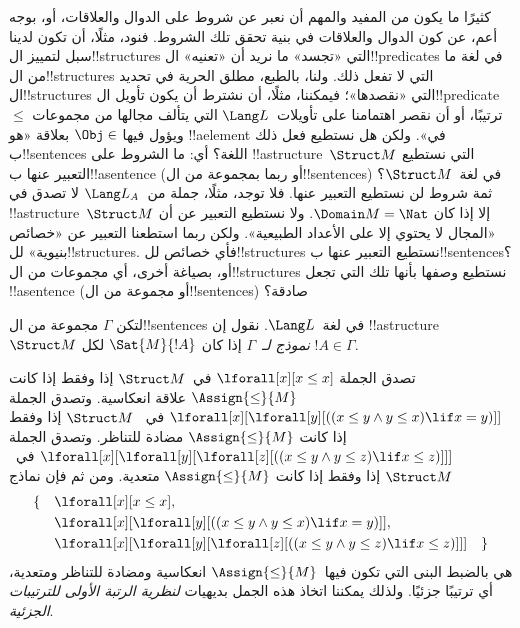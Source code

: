 \documentclass[../../../include/open-logic-section]{subfiles}
\begin{document}


\begin{explain}
كثيرًا ما يكون من المفيد والمهم أن نعبر عن شروط على الدوال والعلاقات،
أو، بوجه أعم، عن كون الدوال والعلاقات في بنية تحقق تلك الشروط. فنود،
مثلًا، أن تكون لدينا سبل لتمييز ال!!{structure}s التي «تجسد» ما نريد
أن «تعنيه» ال!!{predicate}s في لغة ما من ال!!{structure}s التي لا
تفعل ذلك. ولنا، بالطبع، مطلق الحرية في تحديد ال!!{structure}s التي
«نقصدها»؛ فيمكننا، مثلًا، أن نشترط أن يكون تأويل
ال!!{predicate}~$\le$ ترتيبًا، أو أن نقصر اهتمامنا على تأويلات~$\Lang
L$ التي يتألف مجالها من مجموعات ويؤول فيها $\Obj \in$ بعلاقة «هو
!!a{element} في». ولكن هل نستطيع فعل ذلك ب!!{sentence}s اللغة؟ أي:
ما الشروط على !!a{structure}~$\Struct M$ التي نستطيع التعبير عنها
ب!!a{sentence} (أو ربما بمجموعة من ال!!{sentence}s) في لغة~$\Struct
M$؟ ثمة شروط لن نستطيع التعبير عنها. فلا توجد، مثلًا، جملة من~$\Lang
L_A$ لا تصدق في !!a{structure}~$\Struct M$ إلا إذا كان
$\Domain M = \Nat$. ولا نستطيع التعبير عن أن «المجال لا يحتوي إلا
على الأعداد الطبيعية». ولكن ربما استطعنا التعبير عن «خصائص بنيوية»
لل!!{structure}s. فأي خصائص لل!!{structure}s نستطيع التعبير عنها
ب!!{sentence}s؟ أو، بصياغة أخرى، أي مجموعات من ال!!{structure}s
نستطيع وصفها بأنها تلك التي تجعل !!a{sentence} (أو مجموعة من
ال!!{sentence}s) صادقة؟
\end{explain}

\begin{defn}
لتكن $\Gamma$ مجموعة من ال!!{sentence}s في لغة~$\Lang L$. نقول إن
!!a{structure}~$\Struct M$ \emph{نموذج لـ}~$\Gamma$ إذا كان
$\Sat{M}{!A}$ لكل $!A \in \Gamma$.
\end{defn}

\begin{ex}
تصدق الجملة $\lforall[x][x \le x]$ في~$\Struct M$ إذا وفقط إذا كانت
$\Assign{\le}{M}$ علاقة انعكاسية. وتصدق الجملة
$\lforall[x][\lforall[y][((x \le y \land y \le x) \lif x = y)]]$ في
~$\Struct M$ إذا وفقط إذا كانت $\Assign{\le}{M}$ مضادة للتناظر.
وتصدق الجملة $\lforall[x][\lforall[y][\lforall[z][((x \le y \land y \le z)
      \lif x \le z)]]]$ في~$\Struct M$ إذا وفقط إذا كانت
$\Assign{\le}{M}$ متعدية. ومن ثم فإن نماذج
\begin{align*}
\{\quad &\lforall[x][x \le x], \\
   & \lforall[x][\lforall[y][((x \le y \land y \le
    x) \lif x = y)]], \\
   &\lforall[x][\lforall[y][\lforall[z][((x \le y
      \land y \le z) \lif x \le z)]]] \quad \}
\end{align*}
هي بالضبط البنى التي تكون فيها~$\Assign{\le}{M}$ انعكاسية ومضادة
للتناظر ومتعدية، أي ترتيبًا جزئيًا. ولذلك يمكننا اتخاذ هذه الجمل
بديهيات \emph{لنظرية الرتبة الأولى للترتيبات الجزئية}.
\end{ex}
\end{document}
